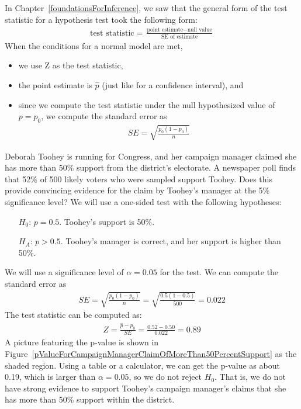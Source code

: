 In Chapter~\ref{foundationsForInference}, we saw that the general form of the test statistic for a hypothesis test took the following form:
\begin{align*}
\text{test statistic} = \frac{\text{point estimate} - \text{null value}}{\text{SE of estimate}}
\end{align*}
When the conditions for a normal model are met,
\begin{itemize}
\item we use Z as the test statistic,
\item the point estimate is $\hat{p}$ (just like for a confidence interval), and
\item since we compute the test statistic under the null hypothesized value of $p = p_0$, we compute the standard error as
\begin{align*}
SE = \sqrt{\frac{p_0(1-p_0)}{n}}
\end{align*}
\end{itemize}

\begin{example}{Deborah Toohey is running for Congress, and her campaign manager claimed she has more than 50\% support from the district's electorate. A newspaper poll finds that 52\% of 500 likely voters who were sampled support Toohey. Does this provide convincing evidence for the claim by Toohey's manager at the 5\% significance level?}\label{TooheyInferenceExample}
We will use a one-sided test with the following hypotheses:
\begin{itemize}
\item[$H_0$:] $p = 0.5$. Toohey's support is 50\%.
\item[$H_A$:] $p > 0.5$. Toohey's manager is correct, and her support is higher than 50\%.
\end{itemize}
We will use a significance level of $\alpha = 0.05$ for the test. We can compute the standard error as
\begin{align*}
SE = \sqrt{\frac{p_0 (1 - p_0)}{n}} = \sqrt{\frac{0.5 (1 - 0.5)}{500}} = 0.022
\end{align*}
The test statistic can be computed as:
\begin{align*}
Z = \frac{\hat{p} - p_0}{SE} = \frac{0.52 - 0.50}{0.022} = 0.89
\end{align*}
A picture featuring the p-value is shown in Figure~\ref{pValueForCampaignManagerClaimOfMoreThan50PercentSupport} as the shaded region. Using a table or a calculator, we can get the p-value as about 0.19, which is larger than $\alpha = 0.05$, so we do not reject $H_0$. That is, we do not have strong evidence to support Toohey's campaign manager's claims that she has more than 50\% support within the district.
\end{example}

